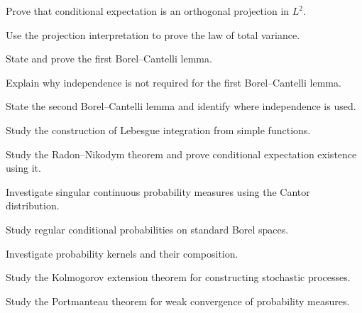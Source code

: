 \begin{exercise}[3]
Prove that conditional expectation is an orthogonal projection in
\(L^2\).
\end{exercise}

\begin{exercise}[3]
Use the projection interpretation to prove the law of total variance.
\end{exercise}

\begin{exercise}[3]
State and prove the first Borel--Cantelli lemma.
\end{exercise}

\begin{exercise}[3]
Explain why independence is not required for the first Borel--Cantelli
lemma.
\end{exercise}

\begin{exercise}[3]
State the second Borel--Cantelli lemma and identify where independence
is used.
\end{exercise}

\begin{exercise}[4]
Study the construction of Lebesgue integration from simple functions.
\end{exercise}

\begin{exercise}[4]
Study the Radon--Nikodym theorem and prove conditional expectation
existence using it.
\end{exercise}

\begin{exercise}[4]
Investigate singular continuous probability measures using the Cantor
distribution.
\end{exercise}

\begin{exercise}[4]
Study regular conditional probabilities on standard Borel spaces.
\end{exercise}

\begin{exercise}[4]
Investigate probability kernels and their composition.
\end{exercise}

\begin{exercise}[4]
Study the Kolmogorov extension theorem for constructing stochastic
processes.
\end{exercise}

\begin{exercise}[4]
Study the Portmanteau theorem for weak convergence of probability
measures.
\end{exercise}

